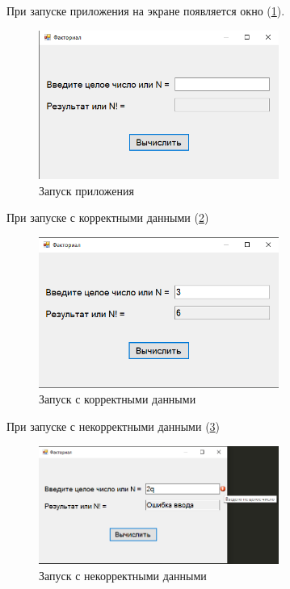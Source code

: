 При запуске приложения на экране появляется окно (\ref{fig:StartForm1}).

\begin{figure}[!h]
    \centering
    \includegraphics[width = 0.7\textwidth]{images/Task1/Start.png}
    \caption{Запуск приложения}
    \label{fig:StartForm1}
\end{figure}

При запуске с корректными данными (\ref{fig:WorkForm1})

\begin{figure}[!h]
    \centering
    \includegraphics[width = 0.7\textwidth]{images/Task1/Work.png}
    \caption{Запуск с корректными данными}
    \label{fig:WorkForm1}
\end{figure}

При запуске с некорректными данными (\ref{fig:BadInputNotIntForm1})

\begin{figure}[!h]
    \centering
    \includegraphics[width = 0.7\textwidth]{images/Task1/BadInputNotInt.png}
    \caption{Запуск с некорректными данными}
    \label{fig:BadInputNotIntForm1}
\end{figure}
